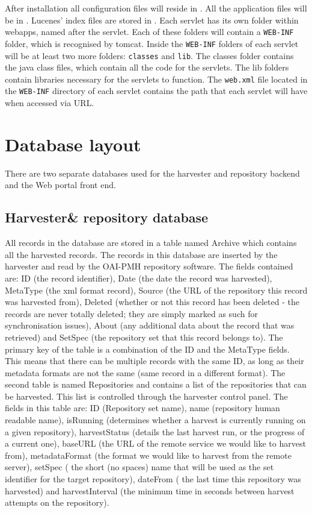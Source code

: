 \documentclass[a4paper,11pt]{article}
\begin{document}
After installation all configuration files will reside in . All the application files will be in . Lucenes' index files are stored in . Each servlet has its own folder within webapps, named after the servlet. Each of these folders will contain a \texttt{WEB-INF} folder, which is recognised by tomcat. Inside the \texttt{WEB-INF} folders of each servlet will be at least two more folders: \texttt{classes} and \texttt{lib}. The classes folder contains the java class files, which contain all the code for the servlets. The lib folders contain libraries necessary for the servlets to function. The \texttt{web.xml} file located in the \texttt{WEB-INF} directory of each servlet contains the path that each servlet will have when accessed via URL.

\section{Database layout}

There are two separate databases used for the harvester and repository backend and the Web portal front end.

\subsection{Harvester\& repository database}

All records in the database are stored in a table named Archive which contains all the harvested records. The records in this database are inserted by the harvester and read by the OAI-PMH repository software. The fields contained are: ID (the record identifier), Date (the date the record was harvested), MetaType (the xml format record), Source (the URL of the repository this record was harvested from), Deleted (whether or not this record has been deleted - the records are never totally deleted; they are simply marked as such for synchronisation issues), About (any additional data about the record that was retrieved) and SetSpec (the repository set that this record belongs to).
The primary key of the table is a combination of the ID and the MetaType fields. This means that there can be multiple records with the same ID, as long as their metadata formats are not the same (same record in a different format).
The second table is named Repositories and contains a list of the repositories that can be harvested. This list is controlled through the harvester control panel. The fields in this table are: ID (Repository set name), name (repository human readable name), isRunning (determines whether a harvest is currently running on a given repository), harvestStatus (details the last harvest run, or the progress of a current one), baseURL (the URL of the remote service we would like to harvest from), metadataFormat (the format we would like to harvest from the remote server), setSpec ( the short (no spaces) name that will be used as the set identifier for the target repository), dateFrom ( the last time this repository was harvested) and harvestInterval (the minimum time in seconds between harvest attempts on the repository).
\end{document}

